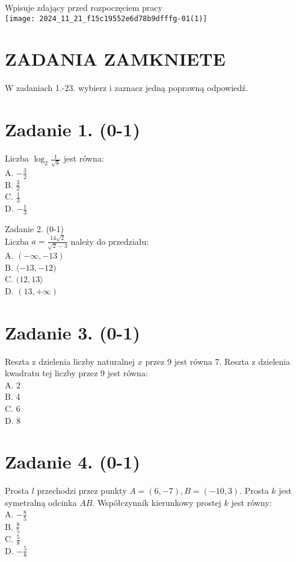 \documentclass[10pt]{article}
\begin{document}
Wpisuje zdający przed rozpoczęciem pracy\\
\texttt{[image: 2024\_11\_21\_f15c19552e6d78b9dfffg-01(1)]}

\section*{ZADANIA ZAMKNIETE}
W zadaniach 1.-23. wybierz i zaznacz jedną poprawną odpowiedź.

\section*{Zadanie 1. (0-1)}
Liczba \(\log _{2} \frac{1}{\sqrt{8}}\) jest równa:\\
A. \(-\frac{3}{2}\)\\
B. \(\frac{3}{2}\)\\
C. \(\frac{1}{3}\)\\
D. \(-\frac{1}{3}\)

Zadanie 2. (0-1)\\
Liczba \(a=\frac{14 \sqrt{2}}{\sqrt{2}-3}\) należy do przedziału:\\
A. \((-\infty,-13)\)\\
B. \(\langle-13,-12)\)\\
C. \((12,13\rangle\)\\
D. \((13,+\infty)\)

\section*{Zadanie 3. (0-1)}
Reszta z dzielenia liczby naturalnej \(x\) przez 9 jest równa 7. Reszta z dzielenia kwadratu tej liczby przez 9 jest równa:\\
A. 2\\
B. 4\\
C. 6\\
D. 8

\section*{Zadanie 4. (0-1)}
Prosta \(l\) przechodzi przez punkty \(A=(6,-7), B=(-10,3)\). Prosta \(k\) jest symetralną odcinka \(A B\). Współczynnik kierunkowy prostej \(k\) jest równy:\\
A. \(-\frac{8}{5}\)\\
B. \(\frac{8}{5}\)\\
C. \(\frac{5}{8}\)\\
D. \(-\frac{5}{8}\)
\end{document}
